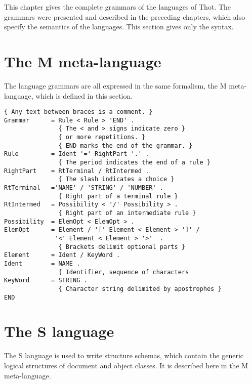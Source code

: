 This chapter gives the complete grammars of the languages of Thot.
The grammars were presented and described in the preceding chapters,
which also specify the semantics of the languages.  This section gives
only the syntax.

\section{The M meta-language}

The language grammars are all expressed in the same formalism, the M
meta-language, which is defined in this section.

\begin{verbatim}
{ Any text between braces is a comment. }
Grammar      = Rule < Rule > 'END' .
               { The < and > signs indicate zero }
               { or more repetitions. }
               { END marks the end of the grammar. }
Rule         = Ident '=' RightPart '.' .
               { The period indicates the end of a rule }
RightPart    = RtTerminal / RtIntermed .
               { The slash indicates a choice }
RtTerminal   ='NAME' / 'STRING' / 'NUMBER' .
               { Right part of a terminal rule }
RtIntermed   = Possibility < '/' Possibility > .
               { Right part of an intermediate rule }
Possibility  = ElemOpt < ElemOpt > .
ElemOpt      = Element / '[' Element < Element > ']' /
              '<' Element < Element > '>'  .
               { Brackets delimit optional parts }
Element      = Ident / KeyWord .
Ident        = NAME .
               { Identifier, sequence of characters
KeyWord      = STRING .
               { Character string delimited by apostrophes }
END
\end{verbatim}

\section{The S language}

The S language is used to write structure schemas, which contain the
generic logical structures of document and object classes.  It is
described here in the M meta-language.

